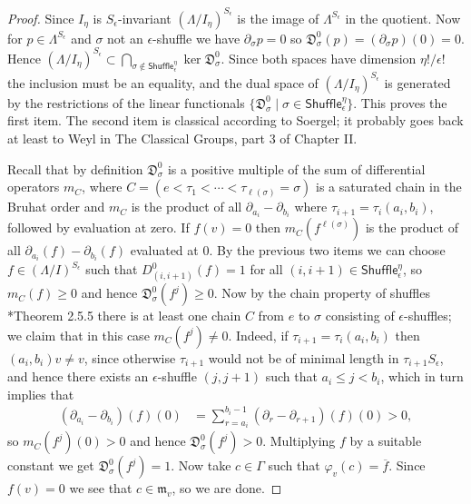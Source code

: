 \documentclass[11pt,fleqn]{article}
\newcommand\DD{\mathfrak D}
\renewcommand\phi{\varphi}
\newcommand\m{\mathfrak m}
\newcommand\Shuffle{\mathsf{Shuffle}}
\begin{document}
\begin{proof}
Since $I_\eta$ is $S_\epsilon$-invariant $(\Lambda/I_\eta)^{S_\epsilon}$ is the
image of $\Lambda^{S_\epsilon}$ in the quotient. Now for $p \in 
\Lambda^{S_\epsilon}$ and $\sigma$ not an $\epsilon$-shuffle we have 
$\partial_\sigma p = 0$ so $\DD_\sigma^0(p) = (\partial_\sigma p)(0) = 0$.
Hence $\displaystyle (\Lambda/I_\eta)^{S_\epsilon} \subset \bigcap_{\sigma 
\notin \Shuffle_\epsilon^\eta} \ker \DD_\sigma^0$. Since both spaces have 
dimension $\eta!/\epsilon!$ the inclusion must be an equality, and the dual 
space of $(\Lambda/I_\eta)^{S_\epsilon}$ is generated by the restrictions of
the linear functionals $\{\DD_\sigma^0 \mid \sigma \in \Shuffle_\epsilon^\eta
\}$. This proves the first item. The second item is classical according to
Soergel; it probably goes back at least to Weyl in The Classical Groups, part 
3 of Chapter II.

Recall that by definition $\DD^0_\sigma$ is a positive multiple of the sum of 
differential operators $m_C$, where $C = (e < \tau_1 < \cdots < 
\tau_{\ell(\sigma)} = \sigma)$ is a saturated chain in the Bruhat order and 
$m_C$ is the product of all $\partial_{a_i} - \partial_{b_i}$ where 
$\tau_{i+1} = \tau_i (a_i,b_i)$, followed by evaluation at zero. If $f(v) = 0$ 
then $m_C(f^{\ell(\sigma)})$ is the product of all $\partial_{a_i}(f) - 
\partial_{b_i}(f)$ evaluated at $0$. By the previous two items we can choose
$f \in (\Lambda/I)^{S_\epsilon}$ such that $D_{(i,i+1)}^0(f) = 1$ for all 
$(i,i+1) \in \Shuffle_\epsilon^\eta$, so $m_C(f) \geq 0$ and hence 
$\DD_\sigma^0(f^j) \geq 0$. Now by the chain property of shuffles 
\cite{BB-coxeter-book}*{Theorem 2.5.5} there is at least one chain $C$
from $e$ to $\sigma$ consisting of $\epsilon$-shuffles; we claim that in this
case $m_C(f^j) \neq 0$. Indeed, if $\tau_{i+1} = \tau_i (a_i,b_i)$ then
$(a_i, b_i) v \neq v$, since otherwise $\tau_{i+1}$ would not be of minimal
length in $\tau_{i+1} S_\epsilon$, and hence there exists an $\epsilon$-shuffle
$(j,j+1)$ such that $a_i \leq j < b_i$, which in turn implies that 
\begin{align*}
	(\partial_{a_i} - \partial_{b_i})(f)(0)
		&= \sum_{r = a_i}^{b_i-1} (\partial_{r} - \partial_{r+1})(f)(0)
		> 0,
\end{align*}
so $m_C(f^j)(0) > 0$ and hence $\DD_\sigma^0(f^j) > 0$. Multiplying $f$ by
a suitable constant we get $\DD_\sigma^0(f^j) = 1$. Now take $c \in \Gamma$
such that $\phi_v(c) = \overline f$. Since $f(v) = 0$ we see that $c \in 
\m_v$, so we are done.
\end{proof}
\end{document}

